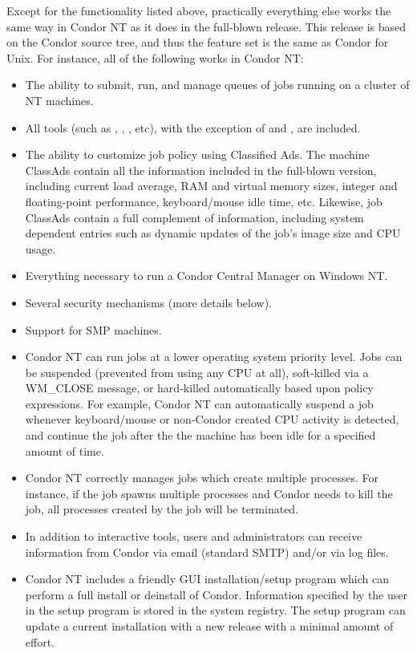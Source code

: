Except for the functionality listed above, practically everything else works
the same way in Condor NT as it does in the full-blown release.
This release is based on the Condor \VersionNotice source tree, and thus the
feature set is the same as Condor \VersionNotice for Unix.  
For instance, all of the following works in Condor NT:
\begin{itemize}

\item The ability to submit, run, and manage queues of jobs running on a
cluster of NT machines.

\item All tools (such as , , ,
etc), with the exception of  and , are 
included.

\item The ability to customize job policy using Classified Ads.  The machine
ClassAds contain all the information included in the full-blown version,
including current load average, RAM and virtual memory sizes, integer and
floating-point performance, keyboard/mouse idle time, etc.  Likewise, job
ClassAds contain a full complement of information, including system
dependent entries such as dynamic updates of the job's image size and CPU
usage.

\item Everything necessary to run a Condor Central Manager on Windows NT.

\item Several security mechanisms (more details below).

\item Support for SMP machines.

\item Condor NT can run jobs at a lower operating system priority level.
Jobs can be suspended (prevented from using any CPU at all), soft-killed via
a WM\_CLOSE message, or hard-killed automatically based upon policy
expressions.  For example, Condor NT can automatically suspend a job
whenever keyboard/mouse or non-Condor created CPU activity is detected, and
continue the job after the the machine has been idle for a specified amount
of time.

\item Condor NT correctly manages jobs which create multiple processes.  For
instance, if the job spawns multiple processes and Condor needs to kill the
job, all processes created by the job will be terminated.

\item In addition to interactive tools, users and administrators can receive
information from Condor via email (standard SMTP) and/or via log files.

\item Condor NT includes a friendly GUI installation/setup program which can
perform a full install or deinstall of Condor.
Information specified by the user in the setup program is stored in the
system registry.  The setup program can update a current installation with a
new release with a minimal amount of effort.

\end{itemize}

